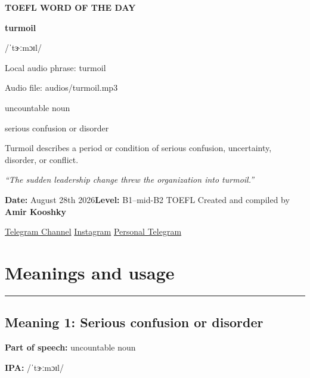 \documentclass[11pt]{article}
\newcommand{\sectionrule}{\par\vspace{-0.5em}\noindent\textcolor{Accent}{\rule{\linewidth}{0.6pt}}\par}
\begin{document}
\begin{center}
{\sffamily\bfseries\color{Accent} TOEFL WORD OF THE DAY\par}
\vspace{8mm}
{\fontsize{42}{48}\selectfont\bfseries turmoil\par}
\vspace{2mm}
{\Large\sffamily\color{Accent} /ˈtɝːmɔɪl/\par}
\vspace{2mm}
{\small\sffamily Local audio phrase: turmoil\par}
{\small\sffamily Audio file: audios/turmoil.mp3\par}
\vspace{2mm}
{\large\sffamily\color{Muted} uncountable noun\par}
\vspace{5mm}
{\sffamily serious confusion or disorder\par}
\vspace{6mm}
{\large Turmoil describes a period or condition of serious confusion, uncertainty, disorder, or conflict.\par}
\vspace{6mm}
\begin{minipage}{0.84\textwidth}
\itshape “The sudden leadership change threw the organization into turmoil.”
\end{minipage}\par
\vspace{10mm}
\textbf{Date:} August 28th 2026\quad\textbullet\quad \textbf{Level:} B1--mid-B2 TOEFL
\vfill
Created and compiled by \textbf{Amir Kooshky}\par
\vspace{2mm}
\href{https://t.me/KooshkyTOEFL}{Telegram Channel}\quad\textbullet\quad
\href{https://www.instagram.com/kooshkytoefl}{Instagram}\quad\textbullet\quad
\href{https://t.me/KooshkyTOEFL\_pv}{Personal Telegram}
\end{center}
\newpage
\tableofcontents
\newpage

\section{Meanings and usage}
\sectionrule
\subsection{Meaning 1: Serious confusion or disorder}
\textbf{Part of speech:} uncountable noun

\textbf{IPA:} /ˈtɝːmɔɪl/
\end{document}
